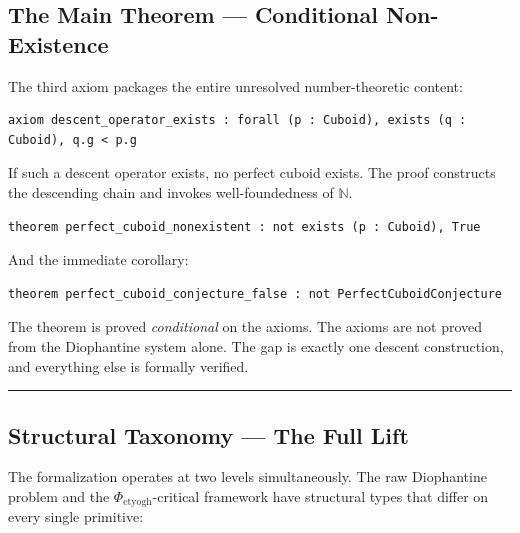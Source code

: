 \documentclass[12pt,a4paper]{article}
\begin{document}
\subsection{The Main Theorem --- Conditional Non-Existence}

The third axiom packages the entire unresolved number-theoretic content:

\begin{lstlisting}[language=lean]
axiom descent_operator_exists : forall (p : Cuboid), exists (q : Cuboid), q.g < p.g
\end{lstlisting}

If such a descent operator exists, no perfect cuboid exists. The proof constructs the descending chain and invokes well-foundedness of $\mathbb{N}$.

\begin{lstlisting}[language=lean]
theorem perfect_cuboid_nonexistent : not exists (p : Cuboid), True
\end{lstlisting}

And the immediate corollary:

\begin{lstlisting}[language=lean]
theorem perfect_cuboid_conjecture_false : not PerfectCuboidConjecture
\end{lstlisting}

The theorem is proved \emph{conditional} on the axioms. The axioms are not proved from the Diophantine system alone. The gap is exactly one descent construction, and everything else is formally verified.

\begin{center}
\rule{0.5\textwidth}{0.4pt}
\end{center}

\subsection{Structural Taxonomy --- The Full Lift}

The formalization operates at two levels simultaneously. The raw Diophantine problem and the $\Phi_{\text{ctyogh}}$-critical framework have structural types that differ on every single primitive:
\end{document}
